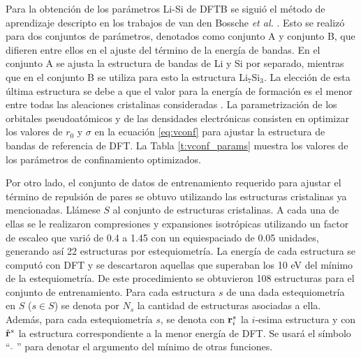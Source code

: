Para la obtención de los parámetros Li-Si de DFTB se siguió el 
método de aprendizaje descripto en los trabajos de van den Bossche \textit{et al.}
\cite{van2018, van2019}. Esto se realizó para dos conjuntos de parámetros, 
denotados como conjunto A y conjunto B, que difieren entre ellos en el ajuste
del término de la energía de bandas. En el conjunto A se ajusta la estructura 
de bandas de Li y Si por separado, mientras que en el conjunto B se utiliza para 
esto la estructura Li$_7$Si$_3$. La elección de esta última estructura se debe a
que el valor para la energía de formación es el menor entre todas las aleaciones
cristalinas consideradas \cite{materials_project}. La parametrización de los 
orbitales pseudoatómicos y de las densidades electrónicas consisten en optimizar 
los valores de $r_0$ y $\sigma$ en la ecuación \ref{eq:vconf} para ajustar la 
estructura de bandas de referencia de DFT. La Tabla \ref{t:vconf_params} muestra
los valores de los parámetros de confinamiento optimizados.
\begin{table}[h!]
    \centering
    \caption{Parámetros del potencial de confinamiento $r_0$ y $\sigma$ para 
    los orbitales atómicos $\phi$ y las densidades $\rho^0$ de Li y Si}
    \setlength\extrarowheight{2pt}
    \label{t:vconf_params}
\end{table}

Por otro lado, el conjunto de datos de entrenamiento requerido para ajustar el 
término de repulsión de pares se obtuvo utilizando las estructuras cristalinas 
ya mencionadas. Llámese $S$ al conjunto de estructuras cristalinas. A cada una de 
ellas se le realizaron compresiones y expansiones isotrópicas utilizando un 
factor de escaleo que varió de 0.4 a 1.45 con un equiespaciado de 0.05 unidades, 
generando así 22 estructuras por estequiometría. La energía de cada estructura se 
computó con DFT y se descartaron aquellas que superaban los 10 eV del mínimo de 
la estequiometría. De este procedimiento se obtuvieron 108 estructuras para el 
conjunto de entrenamiento. Para cada estructura $s$ de una dada estequiometría 
en $S$ ($s \in S$) se denota por $N_s$ la cantidad de estructuras asociadas a 
ella. Además, para cada estequiometría $s$, se denota con ${\bf r}^s_i$ la 
$i$-esima estructura y con $\check{{\bf r}}^s$ la estructura correspondiente a la
menor energía de DFT. Se usará el símbolo ``$\ \check{\ }\ $'' para denotar 
el argumento del mínimo de otras funciones.

